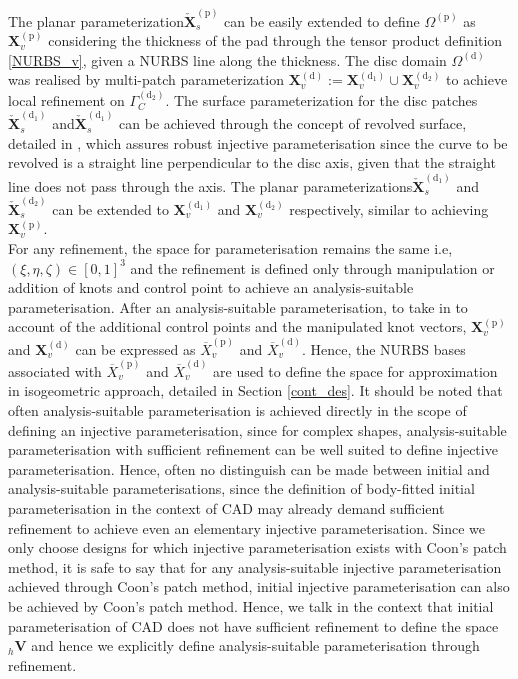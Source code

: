 The planar parameterization$ \bm {\check{X}}_{s}^{(\mathrm p)}$ can be easily extended to define $\Omega^{(\mathrm p)}$ as $\bm X_{v}^{(\mathrm p)}$ considering the thickness of the pad through the tensor product definition \eqref{NURBS_v}, given a NURBS line along the thickness. 
The disc domain $\Omega^{(\mathrm d)}$ was realised by multi-patch parameterization $\bm X_{v}^{(\mathrm d)} := \bm X_{v}^{(\mathrm d_1)} \cup \bm X_{v}^{(\mathrm d_2)}$ to achieve local refinement on $\Gamma_C^{(\mathrm d_2)}$. {The surface parameterization for the disc patches$ \bm {\check{X}}_{s}^{(\mathrm d_1)}$ and$ \bm {\check{X}}_{s}^{(\mathrm d_1)}$ can be achieved through the concept of revolved surface, detailed in \citep{Piegl1995TheNB}, which assures robust injective parameterisation since the curve to be revolved is a straight line perpendicular to the disc axis, given that the straight line does not pass through the axis. The planar parameterizations$ \bm {\check{X}}_{s}^{(\mathrm d_1)}$ and$ \bm {\check{X}}_{s}^{(\mathrm d_2)}$ can be extended to $\bm X_{v}^{(\mathrm d_1)}$ and $\bm X_{v}^{(\mathrm d_2)}$ respectively, similar to achieving $\bm X_{v}^{(\mathrm p)}$}.\\

For any refinement, the space for parameterisation remains the same i.e, $(\xi,\eta,\zeta) \in [0,1]^3$ and the refinement is defined only through manipulation or addition of knots and control point to achieve an analysis-suitable parameterisation. 
After an analysis-suitable parameterisation, to take in to account of the additional control points and the manipulated knot vectors, $\bm X_{v}^{(\mathrm p)}$ and $\bm X_{v}^{(\mathrm d)}$ can be expressed as $\overline{X}_{v}^{(\mathrm p)}$ and $\overline{X}_{v}^{(\mathrm d)}$. 
Hence, the NURBS bases associated with $\overline{X}_{v}^{(\mathrm p)}$ and $\overline{X}_{v}^{(\mathrm d)}$ are used to define the space for approximation in isogeometric approach, detailed in Section \ref{cont_des}. It should be noted that often analysis-suitable parameterisation is achieved directly in the scope of defining an injective parameterisation, since for complex shapes, analysis-suitable parameterisation with sufficient refinement can be well suited to define injective parameterisation.
Hence, often no distinguish can be made between initial and analysis-suitable parameterisations, since the definition of body-fitted initial parameterisation in the context of CAD may already demand sufficient refinement to achieve even an elementary injective  parameterisation. Since we only choose designs for which injective parameterisation exists with Coon's patch method, it is safe to say that for any analysis-suitable injective parameterisation achieved through Coon's patch method, initial injective parameterisation can also be achieved by Coon's patch method. Hence, we talk in the context that initial parameterisation of CAD does not have sufficient refinement  to define the space ${}_h\bm V$ and hence we explicitly define analysis-suitable parameterisation through refinement.\\

